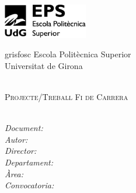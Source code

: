 

\begin{titlepage}
\begin{center}

\begin{minipage}{0.49\linewidth}
\begin{flushleft}
\includegraphics[height=1.5cm]{./img/logos/EPS}
\end{flushleft}
\end{minipage}
\begin{minipage}{0.49\linewidth}
\begin{flushright}
\end{flushright}
\end{minipage}

\vspace{2cm}

\begin{color}{grisfosc}
\large
Escola Politècnica Superior\\[0.2cm]
Universitat de Girona\\[1.9cm]
\end{color}

{\LARGE \bfseries \titulo}\\[1.5cm]
\textsc{\large Projecte/Treball Fi de Carrera}\\[0.4cm]
\textcolor{grisclar}{\large\titulacion}\\[5.0cm]

\vspace{5cm}

\begin{flushleft} \large
\emph{Document:} \doc\\[0.15cm]
\emph{Autor:} \autor\\[0.15cm]
\emph{Director:} \director\\[0.15cm]
\emph{Departament:} \departament\\[0.15cm]
\emph{Àrea:} \deparea\\[0.15cm]
\emph{Convocatoria:} \convocatoria\\[0.15cm]
\end{flushleft}


\end{center}

\end{titlepage}

